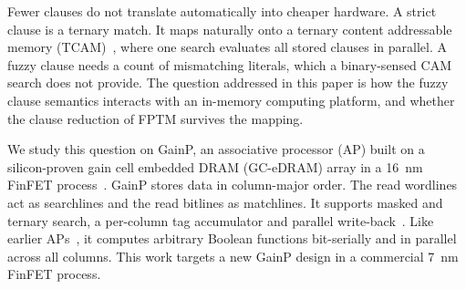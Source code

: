 \documentclass[preprint,review,12pt]{elsarticle}
\newcommand{\gainp}{GainP}
\begin{document}
Fewer clauses do not translate automatically into cheaper hardware.
A strict clause is a ternary match. It maps naturally onto a ternary content addressable memory (TCAM)~\cite{pagiamtzis2006cam}, where one search evaluates all stored clauses in parallel.
A fuzzy clause needs a count of mismatching literals, which a binary-sensed CAM search does not provide.
The question addressed in this paper is how the fuzzy clause semantics interacts with an in-memory computing platform, and whether the clause reduction of FPTM survives the mapping.

We study this question on \gainp{}, an associative processor (AP) built on a silicon-proven gain cell embedded DRAM (GC-eDRAM) array in a 16~nm FinFET process~\cite{levi2026gainp}.
\gainp{} stores data in column-major order. The read wordlines act as searchlines and the read bitlines as matchlines. It supports masked and ternary search, a per-column tag accumulator and parallel write-back~\cite{levi2026gainp}.
Like earlier APs~\cite{yavits2015rap}, it computes arbitrary Boolean functions bit-serially and in parallel across all columns.
This work targets a new \gainp{} design in a commercial 7~nm FinFET process.
\end{document}
